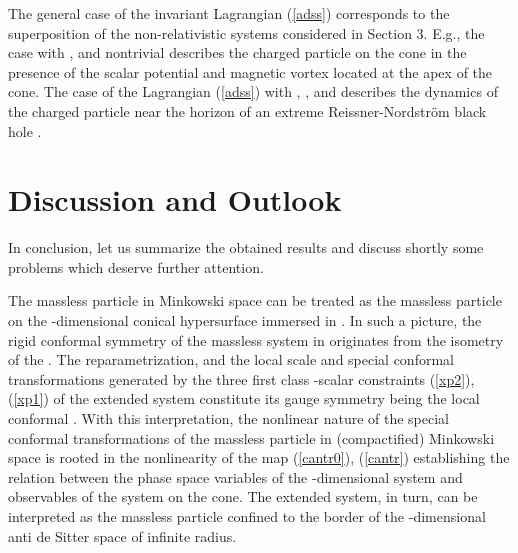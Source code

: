 \documentclass[a4paper,12pt]{article}
\def\R{\mathbb R}
\begin{document}
The general case of the
\coordHE{} invariant Lagrangian (\ref{adss})
corresponds to the
superposition
of the non-relativistic systems considered in Section 3.
E.g., the \coordHE{} case with \coordHE{}, \coordHE{}
and nontrivial \coordHE{}
describes the charged particle on the cone
in the presence of the
scalar potential \coordHE{} and magnetic
vortex located
at the apex of the cone.
The \coordHE{} case of the Lagrangian (\ref{adss})
with \coordHE{}, \coordHE{}, and
\coordHE{}
describes the dynamics of the charged particle near the
horizon of an extreme Reissner-Nordstr\"om
black hole \cite{kallosh,Bell}.



\section{Discussion and Outlook}

In conclusion, let us summarize
the obtained results and discuss shortly
some problems which deserve further attention.

The massless particle in
Minkowski space \myHighlight{$\R^{1,d-1}$}\coordHE{}
can be treated as the massless particle
on the \coordHE{}-dimensional conical
hypersurface immersed in
\myHighlight{${\cal R}^{2,d}=\R^{2,d}-\{0\}$}\coordHE{}.
In such a picture,
the rigid conformal symmetry \coordHE{}
of the massless system in \myHighlight{$\R^{1,d-1}$}\coordHE{}
originates from the isometry of the \coordHE{}.
The reparametrization, and the local scale and
special conformal transformations
generated by the three
first class \coordHE{}-scalar
constraints (\ref{xp2}), (\ref{xp1})
of the extended system
constitute its gauge symmetry being the
local conformal \coordHE{}.
With this interpretation,
the nonlinear nature of the special
conformal transformations of the massless particle
in (compactified) Minkowski space
is rooted in the nonlinearity
of the map (\ref{cantr0}),
(\ref{cantr}) establishing the relation between the
phase space variables of the \coordHE{}-dimensional system
and observables of the
system on the cone.
The extended system, in turn,  can be interpreted
as the massless particle
confined to the border of the \coordHE{}-dimensional
anti de Sitter space
of infinite radius.
\end{document}
